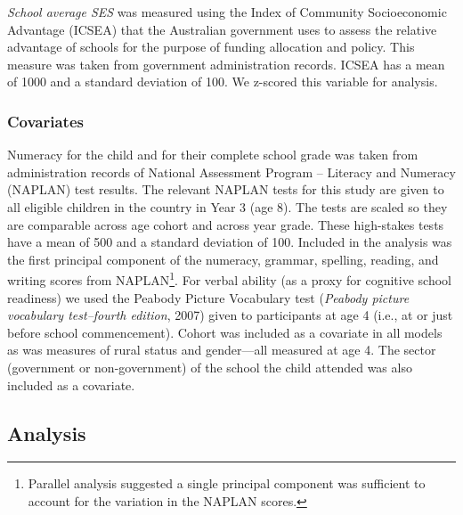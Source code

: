\documentclass[
  english,
  man]{apa6}
\begin{document}
\emph{School average SES} was measured using the Index of Community Socioeconomic Advantage (ICSEA) that the Australian government uses to assess the relative advantage of schools for the purpose of funding allocation and policy. This measure was taken from government administration records. ICSEA has a mean of 1000 and a standard deviation of 100. We z-scored this variable for analysis.

\hypertarget{covariates}{%
\subsubsection{Covariates}\label{covariates}}

Numeracy for the child and for their complete school grade was taken from administration records of National Assessment Program -- Literacy and Numeracy (NAPLAN) test results. The relevant NAPLAN tests for this study are given to all eligible children in the country in Year 3 (age 8). The tests are scaled so they are comparable across age cohort and across year grade. These high-stakes tests have a mean of 500 and a standard deviation of 100. Included in the analysis was the first principal component of the numeracy, grammar, spelling, reading, and writing scores from NAPLAN\footnote{Parallel analysis suggested a single principal component was sufficient to account for the variation in the NAPLAN scores.}. For verbal ability (as a proxy for cognitive school readiness) we used the Peabody Picture Vocabulary test (\emph{Peabody picture vocabulary test--fourth edition}, 2007) given to participants at age 4 (i.e., at or just before school commencement). Cohort was included as a covariate in all models as was measures of rural status and gender---all measured at age 4. The sector (government or non-government) of the school the child attended was also included as a covariate.

\hypertarget{analysis}{%
\subsection{Analysis}\label{analysis}}
\end{document}
